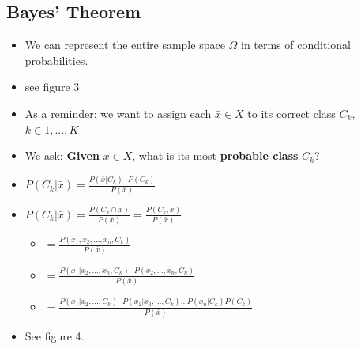 \documentclass{article}
\begin{document}
\subsection{Bayes' Theorem}
\label{sec:orgheadline3}
\begin{itemize}
\item We can represent the entire sample space \(\Omega\) in terms of conditional
probabilities.
\item see figure 3
\item As a reminder: we want to assign each \(\bar{x} \in X\) to its correct class \(C_k\), \(k \in
  {1,...,K}\)
\item We ask: \textbf{Given} \(\bar{x} \in X\), what is its most \textbf{probable class} \(C_k\)?
\item \(P(C_k|\bar{x}) = \frac{P(\bar{x}|C_k) \cdot P(C_k)}{P(\bar{x})}\)
\item \(P(C_k|\bar{x}) = \frac{P(C_k \cap \bar{x})}{P(\bar{x})} = \frac{P(C_k,
  \bar{x})}{P(\bar{x})}\)
\begin{itemize}
\item \(= \frac{P(x_1, x_2, ..., x_n, C_k)}{P(\bar{x})}\)
\item \(= \frac{P(x_1|x_2,...,x_n,C_k) \cdot P(x_2,...,x_n,C_n)}{P(\bar{x})}\)
\item \(= \frac{P(x_1|x_2,...,C_k) \cdot
    P(x_2|x_3,...,C_k)...P(x_n|C_k)P(C_k)}{P(\bar{x})}\)
\end{itemize}
\item See figure 4.
\end{itemize}
\end{document}
